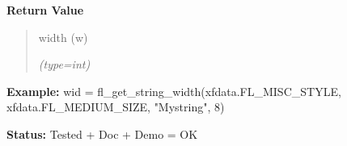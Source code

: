 \begin{boxedminipage}{\funcwidth}
\begin{quote}
      \end{quote}

      \textbf{Return Value}
    \vspace{-1ex}

      \begin{quote}
      width (w)

      {\it (type=int)}

      \end{quote}

\textbf{Example:} wid = fl\_get\_string\_width(xfdata.FL\_MISC\_STYLE, 
xfdata.FL\_MEDIUM\_SIZE, "Mystring", 8)



\textbf{Status:} Tested + Doc + Demo = OK



    \end{boxedminipage}

    \label{xformslib:flbasic:fl_get_string_widthTAB}

    \vspace{0.5ex}

